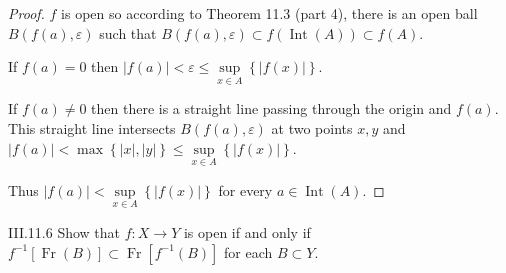 \begin{proof}
	\( f \) is open so according to Theorem 11.3 (part 4), there is an open ball \( B(f(a), \varepsilon) \) such that \( B(f(a), \varepsilon) \subset f(\operatorname{Int}(A)) \subset f(A) \).

	If \( f(a) = 0 \) then \( \left\vert f(a) \right\vert < \varepsilon \le \sup\limits_{x\in A}\left\{ \left\vert f(x) \right\vert \right\} \).

	If \( f(a) \ne 0 \) then there is a straight line passing through the origin and \( f(a) \). This straight line intersects \( B(f(a), \varepsilon) \) at two points \( x, y \) and \( \left\vert f(a) \right\vert < \max\left\{ \left\vert x \right\vert, \left\vert y \right\vert \right\} \le \sup\limits_{x\in A}\left\{ \left\vert f(x) \right\vert \right\} \).

	Thus \( \left\vert f(a) \right\vert < \sup\limits_{x\in A}\left\{ \left\vert f(x) \right\vert \right\} \) for every \( a \in \operatorname{Int}(A) \).
\end{proof}

\begin{problem}{III.11.6}
Show that \( f: X \to Y \) is open if and only if \( f^{-1}\left\lbrack \operatorname{Fr}(B) \right\rbrack \subset \operatorname{Fr}\left\lbrack f^{-1}(B) \right\rbrack \) for each \( B \subset Y \).
\end{problem}

